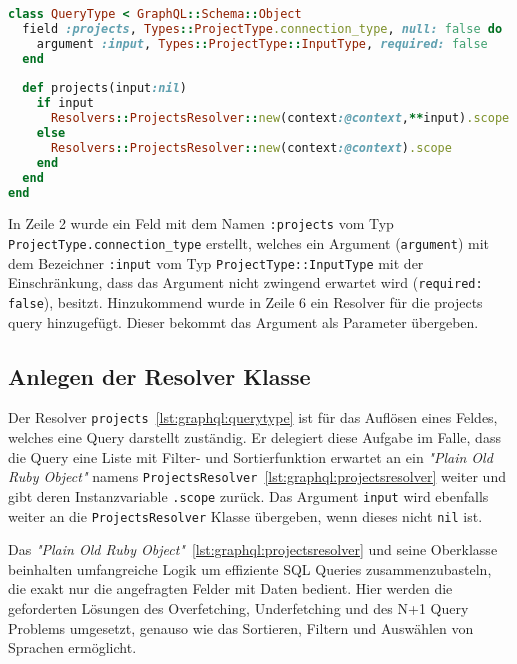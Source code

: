 \begin{lstlisting}[language=Ruby,float=h!,caption={Definition des QueryType als Einstiegspunkt in alle Queries}, label={lst:graphql:querytype}]
class QueryType < GraphQL::Schema::Object
  field :projects, Types::ProjectType.connection_type, null: false do
    argument :input, Types::ProjectType::InputType, required: false
  end
  
  def projects(input:nil)
    if input
      Resolvers::ProjectsResolver::new(context:@context,**input).scope
    else
      Resolvers::ProjectsResolver::new(context:@context).scope
    end
  end
end
\end{lstlisting}

In Zeile 2 wurde ein Feld mit dem Namen \lstinline|:projects| vom Typ \lstinline|ProjectType.connection_type| erstellt, welches ein Argument (\lstinline|argument|) mit dem Bezeichner \lstinline|:input| vom Typ \lstinline|ProjectType::InputType| mit der Einschränkung, dass das Argument nicht zwingend erwartet wird (\lstinline|required: false|), besitzt.
Hinzukommend wurde in Zeile 6 ein Resolver für die projects query hinzugefügt. Dieser bekommt das Argument als Parameter übergeben.

\subsection{Anlegen der Resolver Klasse}
\label{impl:graphql:resolver}
\label{graphql:resolver}
Der Resolver \lstinline|projects|~\ref{lst:graphql:querytype} ist für das Auflösen eines Feldes, welches eine Query darstellt zuständig. Er delegiert diese Aufgabe im Falle, dass die Query eine Liste mit Filter- und Sortierfunktion erwartet an ein \emph{"Plain Old Ruby Object"} namens \lstinline|ProjectsResolver|~\ref{lst:graphql:projectsresolver} weiter und gibt deren Instanzvariable \lstinline|.scope| zurück. Das Argument \lstinline|input| wird ebenfalls weiter an die \lstinline|ProjectsResolver| Klasse übergeben, wenn dieses nicht \lstinline|nil| ist. 

Das \emph{"Plain Old Ruby Object"}~\ref{lst:graphql:projectsresolver} und seine Oberklasse beinhalten umfangreiche Logik um effiziente SQL Queries zusammenzubasteln, die exakt nur die angefragten Felder mit Daten bedient. Hier werden die geforderten Lösungen des Overfetching, Underfetching und des N+1 Query Problems umgesetzt, genauso wie das Sortieren, Filtern und Auswählen von Sprachen ermöglicht.

